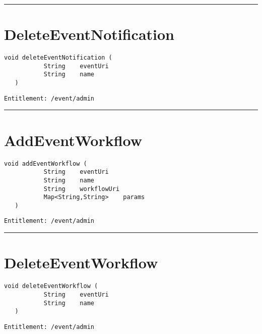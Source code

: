 \rule{12cm}{2pt}
\section{DeleteEventNotification}
\label{Api:DeleteEventNotification}
\begin{lstlisting}[style=nonumbers]
   void deleteEventNotification (
           String    eventUri
           String    name
   )
\end{lstlisting}
\begin{Verbatim}[formatcom=\color{Maroon}]
  Entitlement: /event/admin
\end{Verbatim}



\rule{12cm}{2pt}
\section{AddEventWorkflow}
\label{Api:AddEventWorkflow}
\begin{lstlisting}[style=nonumbers]
   void addEventWorkflow (
           String    eventUri
           String    name
           String    workflowUri
           Map<String,String>    params
   )
\end{lstlisting}
\begin{Verbatim}[formatcom=\color{Maroon}]
  Entitlement: /event/admin
\end{Verbatim}



\rule{12cm}{2pt}
\section{DeleteEventWorkflow}
\label{Api:DeleteEventWorkflow}
\begin{lstlisting}[style=nonumbers]
   void deleteEventWorkflow (
           String    eventUri
           String    name
   )
\end{lstlisting}
\begin{Verbatim}[formatcom=\color{Maroon}]
  Entitlement: /event/admin
\end{Verbatim}



